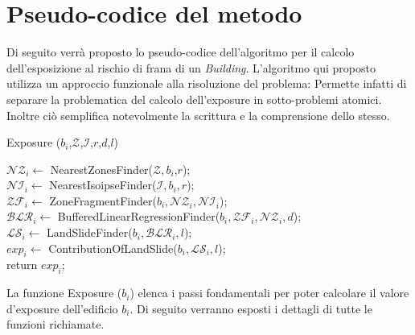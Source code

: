 
\chapter{Pseudo-codice del metodo} %

\label{ch:name} %
Di seguito verrà proposto lo pseudo-codice dell'algoritmo per il calcolo dell'esposizione al rischio di frana di un \textit{Building}. L'algoritmo qui proposto utilizza un approccio funzionale alla risoluzione del problema: Permette infatti di separare la problematica del calcolo dell'exposure in sotto-problemi atomici. Inoltre ciò semplifica notevolmente la scrittura e la comprensione dello stesso.



\begin{algorithm}[H]
	
	
	\IncMargin{1em}
	\caption{Exposure ($b_i$,$\mathcal{Z}$,$\mathcal{I}$,$r$,$d$,$l$)}
	\label{alg:0}
	\BlankLine
	
	\SetAlgoNoLine
	$ \mathcal{NZ}_i \leftarrow$ NearestZonesFinder($\mathcal{Z},b_i$,$r$); \\
	$ \mathcal{NI}_i \leftarrow$ NearestIsoipseFinder($\mathcal{I},b_i,r$); \\
	$ \mathcal{ZF}_i \leftarrow$ ZoneFragmentFinder($b_i , \mathcal{NZ}_i, \mathcal{NI}_i $);  \\
	$ \mathcal{BLR}_i \leftarrow $ BufferedLinearRegressionFinder($b_i,\mathcal{ZF}_i,\mathcal{NZ}_i,d$); \\
	$ \mathcal{LS}_i \leftarrow $ LandSlideFinder($b_i , \mathcal{BLR}_i, l$); \\
	$ exp_i \leftarrow$ ContributionOfLandSlide($b_i, \mathcal{LS}_i, l$);\\
	return $ exp_i $;
	
	
\end{algorithm}
La funzione Exposure ($b_i$) elenca i passi fondamentali per poter calcolare il  valore d'exposure dell'edificio $b_i$. Di seguito verranno esposti i dettagli di tutte le funzioni richiamate.

